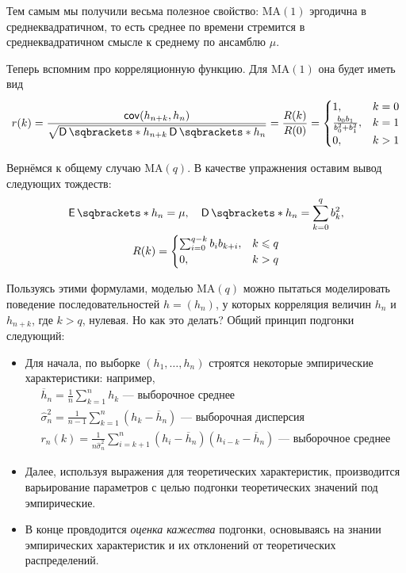 Тем самым мы получили весьма полезное свойство: \(\mathrm{MA}(1)\) эргодична в 
среднеквадратичном, то есть среднее по времени стремится в среднеквадратичном 
смысле к среднему по ансамблю \(\mu\).

Теперь вспомним про корреляционную функцию. Для \(\mathrm{MA}(1)\) она будет 
иметь вид
\[
	r(k) = \frac{\cov(h_{n + k}, h_{n})}{\sqrt{\D{h_{n + k}}\D{h_{n}}}} = 
	\frac{R(k)}{R(0)} = 
	\begin{cases}
	1, & k = 0 \\
	\frac{b_{0}b_{1}}{b_{0}^{2} + b_{1}^{2}}, & k = 1 \\
	0, & k > 1
	\end{cases}
\]

Вернёмся к общему случаю \(\mathrm{MA}(q)\). В качестве упражнения оставим 
вывод следующих тождеств:
\begin{gather*}
	\E{h_{n}} = \mu, \quad \D{h_{n}} = \sum_{k = 0}^{q} b_{k}^{2}, \\
	R(k) = \begin{cases}
	\sum_{i = 0}^{q - k} b_{i}b_{k + i},& k \leq q \\
	0,& k > q
	\end{cases}
\end{gather*}

Пользуясь этими формулами, моделью \(\mathrm{MA}(q)\) можно пытаться 
моделировать поведение последовательностей \(h = (h_{n})\), у которых 
корреляция величин \(h_{n}\) и \(h_{n + k}\), где \(k > q\), нулевая. Но как 
это делать? Общий принцип подгонки следующий:
\begin{itemize}
	\item Для начала, по выборке \((h_{1}, \ldots, h_{n})\) строятся некоторые 
	эмпирические характеристики: например,
	\begin{gather}
		\overline{h}_{n} = \frac{1}{n}\sum_{k = 1}^{n} h_{k}\text{~--- 
		выборочное среднее} \\
		\hat{\sigma}_{n}^{2} = \frac{1}{n - 1}\sum_{k = 1}^{n} (h_{k} - 
		\overline{h}_{n})\text{~--- выборочная дисперсия} \\
		r_{n}(k) = \frac{1}{n\hat{\sigma}_{n}^{2}}\sum_{i = k + 1}^{n}(h_{i} - 
		\overline{h}_{n})(h_{i - k} - \overline{h}_{n})\text{~--- выборочное 
		среднее}
	\end{gather}
	\item Далее, используя выражения для теоретических характеристик, 
	производится варьирование параметров с целью подгонки теоретических 
	значений под эмпирические.
	\item В конце провдодится \emph{оценка кажества} подгонки, основываясь на 
	знании эмпирических характеристик и их отклонений от теоретических 
	распределений.
\end{itemize}

